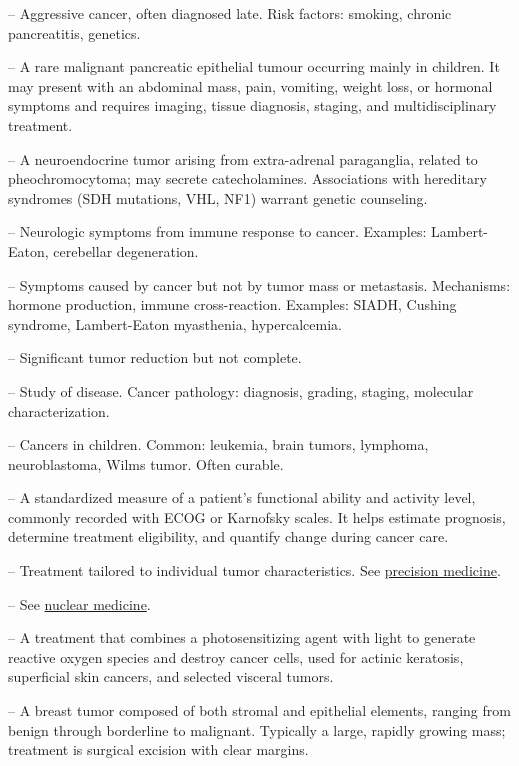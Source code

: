 -- Aggressive cancer, often diagnosed late. Risk factors: smoking, chronic pancreatitis, genetics.

-- A rare malignant pancreatic epithelial tumour occurring mainly in children. It may present with an abdominal mass, pain, vomiting, weight loss, or hormonal symptoms and requires imaging, tissue diagnosis, staging, and multidisciplinary treatment.

-- A neuroendocrine tumor arising from extra-adrenal paraganglia, related to pheochromocytoma; may secrete catecholamines. Associations with hereditary syndromes (SDH mutations, VHL, NF1) warrant genetic counseling.

-- Neurologic symptoms from immune response to cancer. Examples: Lambert-Eaton, cerebellar degeneration.

-- Symptoms caused by cancer but not by tumor mass or metastasis. Mechanisms: hormone production, immune cross-reaction. Examples: SIADH, Cushing syndrome, Lambert-Eaton myasthenia, hypercalcemia.

-- Significant tumor reduction but not complete.

-- Study of disease. Cancer pathology: diagnosis, grading, staging, molecular characterization.

-- Cancers in children. Common: leukemia, brain tumors, lymphoma, neuroblastoma, Wilms tumor. Often curable.

-- A standardized measure of a patient’s functional ability and activity level, commonly recorded with ECOG or Karnofsky scales. It helps estimate prognosis, determine treatment eligibility, and quantify change during cancer care.

-- Treatment tailored to individual tumor characteristics. See \hyperlink{Precision Medicine}{precision medicine}.

-- See \hyperlink{Nuclear Medicine}{nuclear medicine}.

-- A treatment that combines a photosensitizing agent with light to generate reactive oxygen species and destroy cancer cells, used for actinic keratosis, superficial skin cancers, and selected visceral tumors.

-- A breast tumor composed of both stromal and epithelial elements, ranging from benign through borderline to malignant. Typically a large, rapidly growing mass; treatment is surgical excision with clear margins.

